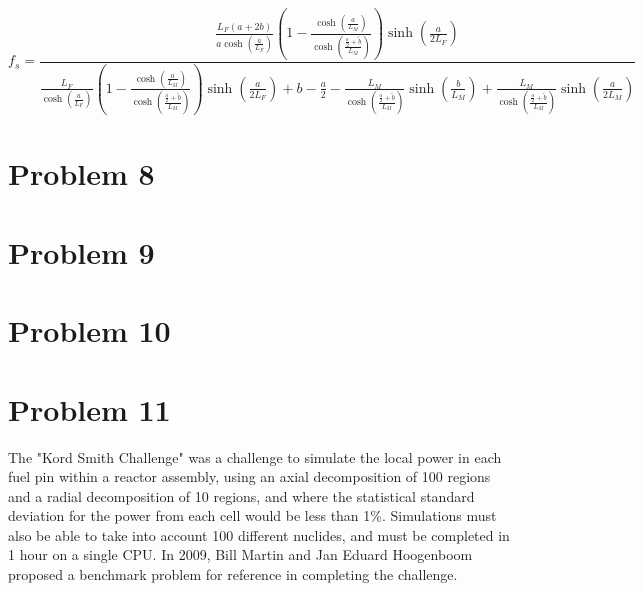\documentclass{article}
\begin{document}
$$\boxed{ f_s = \frac{\frac{L_F(a+2b)}{a \cosh\left(\frac{a}{L_F}\right)}\left( 1 - \frac{\cosh\left(\frac{a}{L_M}\right)}{\cosh\left(\frac{\frac{a}{2}+\tilde{b}}{L_M}\right)}\right)\sinh\left(\frac{a}{2L_F}\right)}{\frac{L_F}{\cosh\left(\frac{a}{L_F}\right)}\left( 1 - \frac{\cosh\left(\frac{a}{L_M}\right)}{\cosh\left(\frac{\frac{a}{2}+\tilde{b}}{L_M}\right)}\right) \sinh\left(\frac{a}{2L_F}\right) + b - \frac{a}{2} - \frac{L_M}{\cosh\left(\frac{\frac{a}{2}+\tilde{b}}{L_M}\right)}\sinh\left(\frac{b}{L_M}\right) + \frac{L_M}{\cosh\left(\frac{\frac{a}{2}+\tilde{b}}{L_M}\right)}\sinh\left(\frac{a}{2L_M}\right)} }$$






\section*{Problem 8}





\section*{Problem 9}





\section*{Problem 10}





\section*{Problem 11}

The "Kord Smith Challenge" was a challenge to simulate the local power in each fuel pin within a reactor assembly, using an axial decomposition of 100 regions and a radial decomposition of 10 regions, and where the statistical standard deviation for the power from each cell would be less than 1\%. Simulations must also be able to take into account 100 different nuclides, and must be completed in 1 hour on a single CPU. In 2009, Bill Martin and Jan Eduard Hoogenboom proposed a benchmark problem for reference in completing the challenge. 
\end{document}
